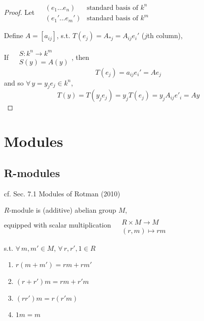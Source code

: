 \begin{proof}
	Let $\begin{aligned} & (e_1\dots e_n) & \text{standard basis of $k^n$ }   \\
	& (e_1' \dots e_m') & \text{standard basis of $k^m$ }  \end{aligned}$

Define $A=[a_{ij}]$, s.t. $T(e_j) = A_{*j} = A_{ij} e_i'$ ($j$th column), 

If $\begin{aligned} 
& S:k^n \to k^m \\ 
& S(y) = A(y) \end{aligned}$, then 
\[
T(e_j) = a_{ij}e_i' = Ae_j
\]
and so $\forall \, y = y_je_j \in k^n$, 
\[
T(y) = T(y_je_j) = y_j T(e_j) = y_j A_{ij}e'_i = Ay
\]


	\end{proof}

\section{Modules}

\subsection{R-modules}

cf. Sec. 7.1 Modules of Rotman (2010) \cite{agat:JRotman2010}

\begin{definition}[$R$-module]
	$R$-module is (additive) abelian group $M$, \\
	equipped with scalar multiplication $\begin{aligned} & \quad \\
	& R \times M \to M \\
	& (r,m) \mapsto rm \end{aligned}$ 
	
	s.t. $\forall \, m,m' \in M$, $\forall \, r,r',1 \in R$
	\begin{enumerate}
		\item[(i)] $r(m+m')=rm+rm'$
		\item[(ii)] $(r+r')m = rm+r'm$
		\item[(iii)] $(rr')m = r(r'm)$
		\item[(iv)] $1m = m$
	\end{enumerate}
\end{definition}

